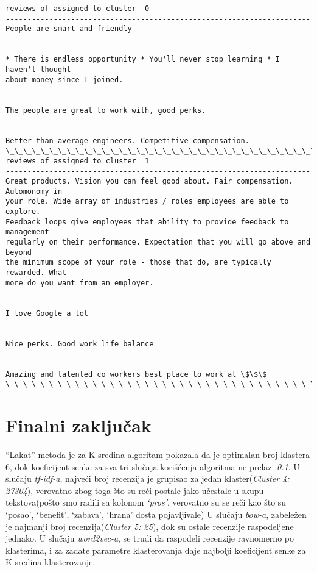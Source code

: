 \documentclass[11pt]{article}
\begin{document}
    \begin{Verbatim}[commandchars=\\\{\}]
reviews of assigned to cluster  0
----------------------------------------------------------------------
People are smart and friendly


* There is endless opportunity * You'll never stop learning * I haven't thought
about money since I joined.


The people are great to work with, good perks.


Better than average engineers. Competitive compensation.
\_\_\_\_\_\_\_\_\_\_\_\_\_\_\_\_\_\_\_\_\_\_\_\_\_\_\_\_\_\_\_\_\_\_\_\_\_\_\_\_\_\_\_\_\_\_\_\_\_\_\_\_\_\_\_\_\_\_\_\_\_\_\_\_\_\_\_\_\_\_
reviews of assigned to cluster  1
----------------------------------------------------------------------
Great products. Vision you can feel good about. Fair compensation. Automonomy in
your role. Wide array of industries / roles employees are able to explore.
Feedback loops give employees that ability to provide feedback to management
regularly on their performance. Expectation that you will go above and beyond
the minimum scope of your role - those that do, are typically rewarded. What
more do you want from an employer.


I love Google a lot


Nice perks. Good work life balance


Amazing and talented co workers best place to work at \$\$\$
\_\_\_\_\_\_\_\_\_\_\_\_\_\_\_\_\_\_\_\_\_\_\_\_\_\_\_\_\_\_\_\_\_\_\_\_\_\_\_\_\_\_\_\_\_\_\_\_\_\_\_\_\_\_\_\_\_\_\_\_\_\_\_\_\_\_\_\_\_\_
    \end{Verbatim}

    \hypertarget{finalni-zakljuux10dak}{%
\section{Finalni zaključak}\label{finalni-zakljuux10dak}}

``Lakat'' metoda je za K-sredina algoritam pokazala da je optimalan broj
klastera 6, dok koeficijent senke za sva tri slučaja korišćenja
algoritma ne prelazi \emph{0.1}. U slučaju \emph{tf-idf-a}, najveći broj
recenzija je grupisao za jedan klaster(\emph{Cluster 4: 27304}),
verovatno zbog toga što su reči postale jako učestale u skupu
tekstova(pošto smo radili sa kolonom \emph{`pros'}, verovatno su se reči
kao što su `posao', `benefit', `zabava', `hrana' dosta pojavljivale) U
slučaju \emph{bow-a}, zabeležen je najmanji broj recenzija(\emph{Cluster
5: 25}), dok su ostale recenzije raspodeljene jednako. U slučaju
\emph{word2vec-a}, se trudi da raspodeli recenzije ravnomerno po
klasterima, i za zadate parametre klasterovanja daje najbolji
koeficijent senke za K-sredina klasterovanje.
\end{document}
